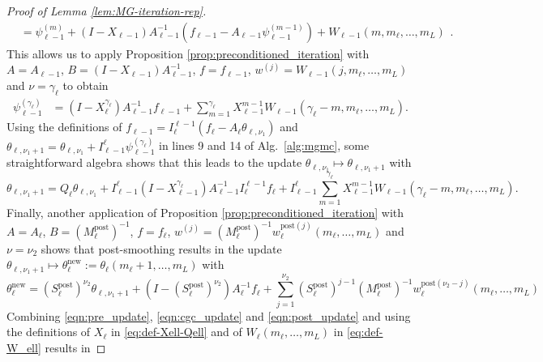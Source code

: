 \documentclass[11pt,english]{article}
\theoremstyle{plain}
\theoremstyle{plain}
\theoremstyle{plain}
\theoremstyle{plain}
\numberwithin{equation}{section}
\newcommand*{\id}{I}
\begin{document}
\begin{proof}[Proof of Lemma \ref{lem:MG-iteration-rep}]
\begin{equation}
\begin{aligned}
			                      & = \psi_{\ell-1}^{(m)} + (\id-X_{\ell-1})A_{\ell-1}^{-1}(f_{\ell-1}-A_{\ell-1}\psi_{\ell-1}^{(m-1)}) + W_{\ell-1}(m,m_{\ell},\dots,m_L)
		\end{aligned}.
	\end{equation}
	This allows us to apply Proposition \ref{prop:preconditioned_iteration} with $A=A_{\ell-1}$, $B=(\id-X_{\ell-1})A_{\ell-1}^{-1}$, $f=f_{\ell-1}$, $w^{(j)}=W_{\ell-1}(j,m_{\ell},\dots,m_L)$ and $\nu=\gamma_\ell$ to obtain
	\begin{equation}
		\begin{aligned}
			\psi^{(\gamma_\ell)}_{\ell-1} & = (\id-X_\ell^{\gamma_\ell}) A_{\ell-1}^{-1}f_{\ell-1}		+\sum_{m=1}^{\gamma_\ell} X_{\ell-1}^{m-1} W_{\ell-1}(\gamma_\ell-m,m_{\ell},\dots,m_L).
		\end{aligned}
	\end{equation}
	Using the definitions of $f_{\ell-1} = I_\ell^{\ell-1} (f_\ell-A_\ell \theta_{\ell,\nu_1})$ and $\theta_{\ell,\nu_1+1}=\theta_{\ell,\nu_1} + I_{\ell-1}^{\ell} \psi_{\ell-1}^{(\gamma_\ell)}$ in lines 9 and 14 of Alg.~\ref{alg:mgmc}, some straightforward algebra shows that this leads to the update $\theta_{\ell,\nu_1}\mapsto \theta_{\ell,\nu_1+1}$ with
	\begin{equation}
		\theta_{\ell,\nu_1+1} = Q_\ell \theta_{\ell,\nu_1} + I_{\ell-1}^{\ell}(\id - X_{\ell-1}^{\gamma_\ell})A_{\ell-1}^{-1} I_{\ell}^{\ell-1} f_\ell
		+ I_{\ell-1}^{\ell} \sum_{m=1}^{\gamma_\ell} X_{\ell-1}^{m-1} W_{\ell-1}(\gamma_\ell-m,m_{\ell},\dots,m_L).
		\label{eqn:cgc_update}
	\end{equation}
	Finally, another application of Proposition \ref{prop:preconditioned_iteration} with $A=A_\ell$, $B=(M_\ell^{\mathrm{post}})^{-1}$, $f=f_\ell$, $w^{(j)}=(M_\ell^{\mathrm{post}})^{-1}w_\ell^{\mathrm{post}(j)}(m_{\ell},\dots,m_L)$ and $\nu=\nu_2$ shows that post-smoothing results in the update $\theta_{\ell,\nu_1+1}\mapsto \theta_{\ell}^{\mathrm{new}}:=\theta_{\ell}(m_\ell+1,\dots,m_L)$ with
	\begin{equation}
		\theta_{\ell}^{\mathrm{new}} = (S_\ell^{\mathrm{post}})^{\nu_2} \theta_{\ell,\nu_1+1} + (\id-(S_{\ell}^{\mathrm{post}})^{\nu_2}) A_{\ell}^{-1}f_{\ell} + \sum_{j=1}^{\nu_2} (S_\ell^{\mathrm{post}})^{j-1} (M_\ell^{\mathrm{post}})^{-1} w_\ell^{\mathrm{post}(\nu_2-j)}(m_{\ell},\dots,m_L)
		\label{eqn:post_update}
	\end{equation}
	Combining \eqref{eqn:pre_update}, \eqref{eqn:cgc_update} and \eqref{eqn:post_update} and using the definitions of $X_\ell$ in \eqref{eq:def-Xell-Qell} and of $W_\ell(m_{\ell},\dots,m_L)$ in \eqref{eq:def-W_ell} results in

\end{proof}
\end{document}
